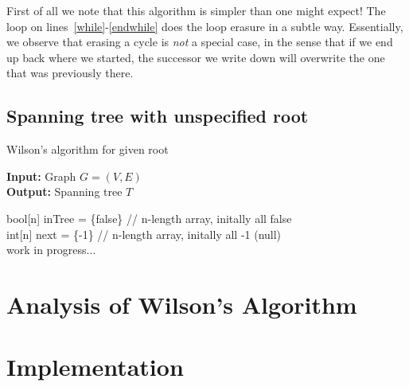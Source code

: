\documentclass[11pt]{article}
\begin{document}
First of all we note that this algorithm is simpler than one might expect! The
loop on lines~\ref{while}-\ref{endwhile} does the loop erasure in a subtle way.
Essentially, we observe that erasing a cycle is \emph{not} a special case, in
the sense that if we end up back where we started, the successor we write down
will overwrite the one that was previously there.
\subsection{Spanning tree with unspecified root}
\begin{algorithm}
\caption{Wilson's algorithm for given root}
\label{alg:root}
\textbf{Input: }Graph $G=(V,E)$ \\
\textbf{Output: }Spanning tree $T$ \\
\begin{algorithmic}
\STATE bool[n] inTree = \{false\} // n-length array, initally all false \\
\STATE int[n] next = \{-1\}       // n-length array, initally all -1 (null) \\
\STATE work in progress...
\end{algorithmic}
\end{algorithm}

\section{Analysis of Wilson's Algorithm}


\section{Implementation}

\printbibliography
\end{document}
